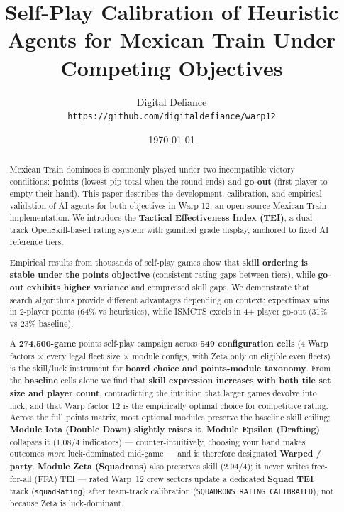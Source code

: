 \documentclass[11pt,letterpaper]{article}
\title{Self-Play Calibration of Heuristic Agents for Mexican Train Under Competing Objectives}
\author{
  Digital Defiance \\
  \texttt{https://github.com/digitaldefiance/warp12}
}
\date{\today}
\begin{document}
\maketitle



\begin{abstract}
Mexican Train dominoes is commonly played under two incompatible victory conditions: \textbf{points} (lowest pip total when the round ends) and \textbf{go-out} (first player to empty their hand). This paper describes the development, calibration, and empirical validation of AI agents for both objectives in Warp 12, an open-source Mexican Train implementation. We introduce the \textbf{Tactical Effectiveness Index (TEI)}, a dual-track OpenSkill-based rating system with gamified grade display, anchored to fixed AI reference tiers.

Empirical results from thousands of self-play games show that \textbf{skill ordering is stable under the points objective} (consistent rating gaps between tiers), while \textbf{go-out exhibits higher variance} and compressed skill gaps. We demonstrate that search algorithms provide different advantages depending on context: expectimax wins in 2-player points (64\% vs heuristics), while ISMCTS excels in 4+ player go-out (31\% vs 23\% baseline). 

A \textbf{274{,}500-game} points self-play campaign across \textbf{549 configuration cells} (4 Warp factors $\times$ every legal fleet size $\times$ module configs, with Zeta only on eligible even fleets) is the skill/luck instrument for \textbf{board choice and points-module taxonomy}. From the \textbf{baseline} cells alone we find that \textbf{skill expression increases with both tile set size and player count}, contradicting the intuition that larger games devolve into luck, and that Warp factor 12 is the empirically optimal choice for competitive rating. Across the full points matrix, most optional modules preserve the baseline skill ceiling; \textbf{Module Iota (Double Down) slightly raises it}. \textbf{Module Epsilon (Drafting)} collapses it (1.08/4 indicators) --- counter-intuitively, choosing your hand makes outcomes \emph{more} luck-dominated mid-game --- and is therefore designated \textbf{Warped / party}. \textbf{Module Zeta (Squadrons)} also preserves skill (2.94/4); it never writes free-for-all (FFA) TEI --- rated Warp~12 crew sectors update a dedicated \textbf{Squad TEI} track (\texttt{squadRating}) after team-track calibration (\texttt{SQUADRONS\_RATING\_CALIBRATED}), not because Zeta is luck-dominant.


\end{abstract}
\end{document}
